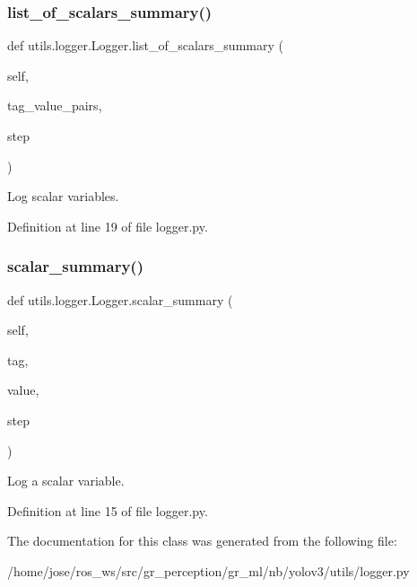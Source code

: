 \subsubsection{\texorpdfstring{list\+\_\+of\+\_\+scalars\+\_\+summary()}{list\_of\_scalars\_summary()}}
{\footnotesize\ttfamily def utils.\+logger.\+Logger.\+list\+\_\+of\+\_\+scalars\+\_\+summary (\begin{DoxyParamCaption}\item[{}]{self,  }\item[{}]{tag\+\_\+value\+\_\+pairs,  }\item[{}]{step }\end{DoxyParamCaption})}

\begin{DoxyVerb}Log scalar variables.\end{DoxyVerb}
 

Definition at line 19 of file logger.\+py.

\mbox{\label{classutils_1_1logger_1_1Logger_ab78ca0bbf04ac70e697670639938b99a}} 
\subsubsection{\texorpdfstring{scalar\+\_\+summary()}{scalar\_summary()}}
{\footnotesize\ttfamily def utils.\+logger.\+Logger.\+scalar\+\_\+summary (\begin{DoxyParamCaption}\item[{}]{self,  }\item[{}]{tag,  }\item[{}]{value,  }\item[{}]{step }\end{DoxyParamCaption})}

\begin{DoxyVerb}Log a scalar variable.\end{DoxyVerb}
 

Definition at line 15 of file logger.\+py.



The documentation for this class was generated from the following file\+:\begin{DoxyCompactItemize}
\item 
/home/jose/ros\+\_\+ws/src/gr\+\_\+perception/gr\+\_\+ml/nb/yolov3/utils/logger.\+py\end{DoxyCompactItemize}
